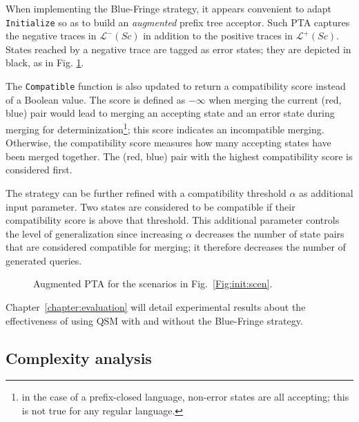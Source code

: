 When implementing the Blue-Fringe strategy, it appears convenient to adapt \texttt{Initialize} so as to build an \emph{augmented} prefix tree acceptor. Such PTA captures the negative traces in $\mathcal{L}^-(Sc)$ in addition to the positive traces in $\mathcal{L}^+(Sc)$. States reached by a negative trace are tagged as error states; they are depicted in black, as in Fig. \ref{figure:augmented-pta}. 

The \texttt{Compatible} function is also updated to return a compatibility score instead of a Boolean value. The score is defined as $-\infty$ when merging the current (red, blue) pair would lead to merging an accepting state and an error state during merging for determinization\footnote{in the case of a prefix-closed language, non-error states are all accepting; this is not true for any regular language.}; this score indicates an incompatible merging. Otherwise, the compatibility score measures how many accepting states have been merged together. The (red, blue) pair with the highest compatibility score is considered first. 

The strategy can be further refined with a compatibility threshold $\alpha$ as additional input parameter. Two states are considered to be compatible if their compatibility score is above that threshold. This additional parameter controls the level of generalization since increasing $\alpha$ decreases the number of state pairs that are considered compatible for merging; it therefore decreases the number of generated queries.

\begin{figure}\centering
{}
\caption[Augmented PTA]{Augmented PTA for the scenarios in Fig.~\ref{Fig:init:scen}\label{figure:augmented-pta}.}
\end{figure}

Chapter~\ref{chapter:evaluation} will detail experimental results about the effectiveness of using QSM with and without the Blue-Fringe strategy.

\subsection{Complexity analysis}

